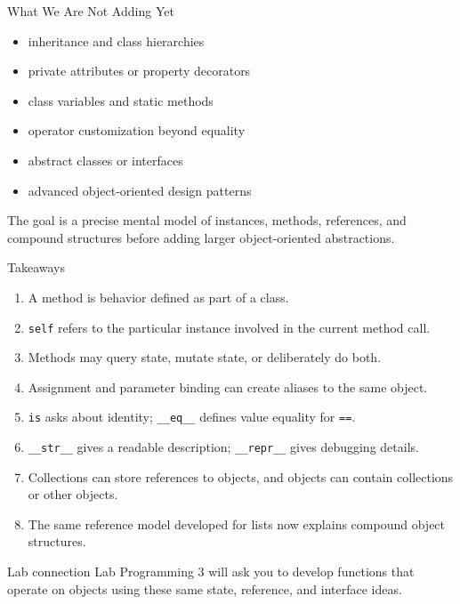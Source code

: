 \documentclass[aspectratio=169,10pt]{beamer}
\begin{document}
\begin{frame}{What We Are Not Adding Yet}
  \begin{itemize}
    \item inheritance and class hierarchies
    \item private attributes or property decorators
    \item class variables and static methods
    \item operator customization beyond equality
    \item abstract classes or interfaces
    \item advanced object-oriented design patterns
  \end{itemize}

  \begin{keyidea}
    The goal is a precise mental model of instances, methods, references, and compound structures before adding larger object-oriented abstractions.
  \end{keyidea}
\end{frame}

\begin{frame}{Takeaways}
  \begin{enumerate}
    \item A method is behavior defined as part of a class.
    \item \texttt{self} refers to the particular instance involved in the current method call.
    \item Methods may query state, mutate state, or deliberately do both.
    \item Assignment and parameter binding can create aliases to the same object.
    \item \texttt{is} asks about identity; \texttt{\_\_eq\_\_} defines value equality for \texttt{==}.
    \item \texttt{\_\_str\_\_} gives a readable description; \texttt{\_\_repr\_\_} gives debugging details.
    \item Collections can store references to objects, and objects can contain collections or other objects.
    \item The same reference model developed for lists now explains compound object structures.
  \end{enumerate}

  \begin{block}{Lab connection}
    Lab Programming 3 will ask you to develop functions that operate on objects using these same state, reference, and interface ideas.
  \end{block}
\end{frame}
\end{document}
